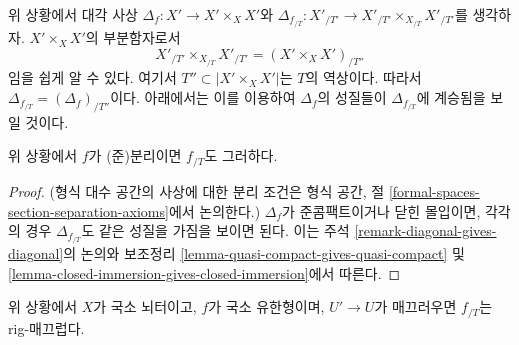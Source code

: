 \begin{remark}
\label{remark-diagonal-gives-diagonal}
위 상황에서 대각 사상
$\Delta_f : X' \to X' \times_X X'$와
$\Delta_{f_{/T}} : X'_{/T'} \to X'_{/T'} \times_{X_{/T}} X'_{/T'}$를
생각하자. $X' \times_X X'$의 부분함자로서
$$
X'_{/T'} \times_{X_{/T}} X'_{/T'} = (X' \times_X X')_{/T''}
$$
임을 쉽게 알 수 있다. 여기서 $T'' \subset |X' \times_X X'|$는
$T$의 역상이다. 따라서
$\Delta_{f_{/T}} = (\Delta_f)_{/T''}$이다. 아래에서는 이를 이용하여
$\Delta_f$의 성질들이 $\Delta_{f_{/T}}$에 계승됨을 보일 것이다.
\end{remark}

\begin{lemma}
\label{lemma-quasi-separated-gives-quasi-separated}
위 상황에서 $f$가 (준)분리이면 $f_{/T}$도 그러하다.
\end{lemma}

\begin{proof}
(형식 대수 공간의 사상에 대한 분리 조건은 형식 공간, 절
\ref{formal-spaces-section-separation-axioms}에서 논의한다.)
$\Delta_f$가 준콤팩트이거나 닫힌 몰입이면, 각각의 경우
$\Delta_{f_{/T}}$도 같은 성질을 가짐을 보이면 된다. 이는 주석
\ref{remark-diagonal-gives-diagonal}의 논의와 보조정리
\ref{lemma-quasi-compact-gives-quasi-compact} 및
\ref{lemma-closed-immersion-gives-closed-immersion}에서 따른다.
\end{proof}

\begin{lemma}
\label{lemma-smooth-gives-rig-smooth}
위 상황에서 $X$가 국소 뇌터이고, $f$가 국소 유한형이며,
$U' \to U$가 매끄러우면 $f_{/T}$는 rig-매끄럽다.
\end{lemma}

